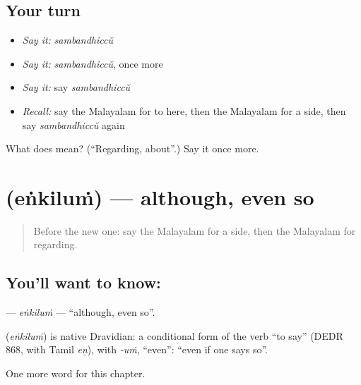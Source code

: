 \subsection*{Your turn}
\begin{itemize}
\raggedright
  \item \emph{Say it:} \emph{sambandhiccŭ}
  \item \emph{Say it:} \emph{sambandhiccŭ}, once more
  \item \emph{Say it:} say \emph{sambandhiccŭ}
  \item \emph{Recall:} say the Malayalam for to here, then the Malayalam for a side, then say \emph{sambandhiccŭ} again
\end{itemize}

\begin{tcolorbox}[breakable,colback=teal!4,colframe=teal!35!black,title={Before you move on}]
What does  mean? (\textquotedblleft{}Regarding, about\textquotedblright{}.) Say it once more.
\end{tcolorbox}
\section[\texorpdfstring{\ml{എങ്കിലും} (eṅkiluṁ)}{എങ്കിലും (eṅkiluṁ)}]{ (eṅkiluṁ) — although, even so}

\label{lesson:ML-C241-enkilum}



\begin{quote}
Before the new one: say the Malayalam for a side, then the Malayalam for regarding.
\end{quote}

\subsection*{You'll want to know: }
\textbf{} — \emph{eṅkiluṁ} — \textquotedblleft{}although, even so\textquotedblright{}.

\begin{cousinweb}
\textbf{} (\emph{eṅkiluṁ}) is native Dravidian: a conditional form of the verb \textquotedblleft{}to say\textquotedblright{} (DEDR 868, with Tamil \emph{eṉ}), with \emph{-uṁ}, \textquotedblleft{}even\textquotedblright{}: \textquotedblleft{}even if one says so\textquotedblright{}.
\end{cousinweb}

\begin{grammarlens}[title={What you've built}]
One more word for this chapter.
\end{grammarlens}

